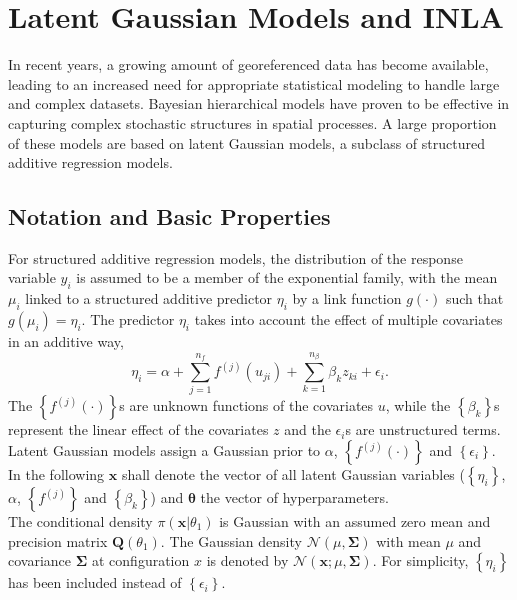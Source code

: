 \section{Latent Gaussian Models and INLA}
In recent years, a growing amount of georeferenced data has become available, leading to an increased need for appropriate statistical modeling to handle large and complex datasets. Bayesian hierarchical models have proven to be effective in capturing complex stochastic structures in spatial processes. A large proportion of these models are based on latent Gaussian models, a subclass of structured additive regression models. 
\subsection*{Notation and Basic Properties}
\label{sec:notation}
For structured additive regression models, the distribution of the response variable $y_i$ is assumed to be a member of the exponential family, with the mean $\mu_i$ linked to a structured additive predictor $\eta_i$ by a link function $g\left(\cdot\right)$ such that $g\left(\mu_i\right)=\eta_i$. The predictor $\eta_i$  takes into account the effect of multiple covariates in an additive way,
\begin{equation}\label{eq:predictor}
    \eta_i=\alpha+\sum_{j=1}^{n_f}f^{(j)}\left(u_{ji}\right)+\sum_{k=1}^{n_{\beta}}\beta_kz_{ki}+\epsilon_i.
\end{equation}
The $\left\lbrace f^{(j)}\left(\cdot\right)\right\rbrace$s are unknown functions of the covariates $u$, while the $\left\lbrace\beta_k\right\rbrace$s represent the linear effect of the covariates $z$ and the $\epsilon_i$s are unstructured terms. Latent Gaussian models assign a Gaussian prior to $\alpha$, $\left\lbrace f^{(j)}\left(\cdot\right)\right\rbrace$ and $\left\lbrace\epsilon_i\right\rbrace$. In the following $\pmb{x}$ shall denote the vector of all latent Gaussian variables ($\left\lbrace\eta_i\right\rbrace$, $\alpha$, $\left\lbrace f^{(j)}\right\rbrace$ and $\left\lbrace\beta_k\right\rbrace$) and $\pmb{\theta}$ the vector of hyperparameters. \\
The conditional density $\pi\left(\pmb{x}|\theta_1\right)$ is Gaussian with an assumed zero mean and precision matrix $\pmb{Q}\left(\theta_1\right)$. The Gaussian density $\mathcal{N}\left(\mu,\pmb{\Sigma}\right)$ with mean $\mu$ and covariance $\pmb{\Sigma}$ at configuration $x$ is denoted by $\mathcal{N}\left(\pmb{x};\mu,\pmb{\Sigma}\right)$. For simplicity, $\left\lbrace\eta_i\right\rbrace$ has been included instead of $\left\lbrace\epsilon_i\right\rbrace$. \\

